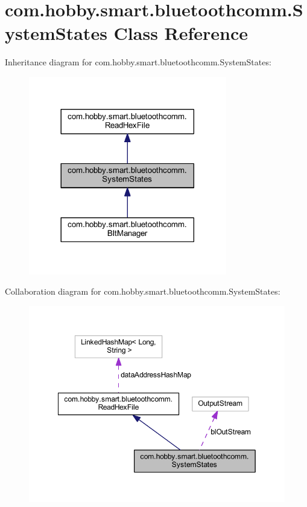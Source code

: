 \hypertarget{classcom_1_1hobby_1_1smart_1_1bluetoothcomm_1_1_system_states}{}\section{com.\+hobby.\+smart.\+bluetoothcomm.\+System\+States Class Reference}
\label{classcom_1_1hobby_1_1smart_1_1bluetoothcomm_1_1_system_states}


Inheritance diagram for com.\+hobby.\+smart.\+bluetoothcomm.\+System\+States\+:\nopagebreak
\begin{figure}[H]
\begin{center}
\leavevmode
\includegraphics[width=245pt]{classcom_1_1hobby_1_1smart_1_1bluetoothcomm_1_1_system_states__inherit__graph}
\end{center}
\end{figure}


Collaboration diagram for com.\+hobby.\+smart.\+bluetoothcomm.\+System\+States\+:\nopagebreak
\begin{figure}[H]
\begin{center}
\leavevmode
\includegraphics[width=349pt]{classcom_1_1hobby_1_1smart_1_1bluetoothcomm_1_1_system_states__coll__graph}
\end{center}
\end{figure}
